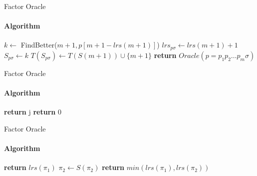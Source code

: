 \begin{frame}[fragile]{Factor Oracle}
  \framesubtitle{Algorithm}
  \begin{algorithm}[H]
    \ContinuedFloat
    \caption{Incremental update of Factor Oracle}
    \begin{algorithmic}[1]
      \State $k \gets $ FindBetter($m+1, p[m+1-lrs(m+1)]$)
      \State $lrs_{p\sigma} \gets lrs(m+1) +1$
      \State $S_{p\sigma} \gets k$
      \EndIf
      \State $T(S_{p\sigma}) \gets T(S(m+1)) \cup \{m+1\}$
      \State \textbf{return} $Oracle(p=p_{1}p_{2}\dots{}p_{m}\sigma)$
      \EndFunction
    \end{algorithmic}
  \end{algorithm}
\end{frame}

\begin{frame}[fragile]{Factor Oracle}
  \framesubtitle{Algorithm}
  \begin{algorithm}[H]
    \caption{Find Better Algorithm}\label{alg:fb}
    \begin{algorithmic}[1]
      \State \textbf{return} j
      \EndIf
      \EndFor
      \State \textbf{return} 0
      \EndFunction
    \end{algorithmic}
  \end{algorithm}
\end{frame}

\begin{frame}[fragile]{Factor Oracle}
  \framesubtitle{Algorithm}
  \begin{algorithm}[H]
    \caption{Length Common Suffix Algorithm}\label{alg:lcs}
    \begin{algorithmic}[1]
      \State \textbf{return} $lrs(\pi_{1})$
      \Else
      \State $\pi_{2} \gets S(\pi_{2})$
      \EndWhile
      \EndIf
      \State \textbf{return} $min(lrs(\pi_{1}),lrs(\pi_{2}))$
      \EndFunction
    \end{algorithmic}
  \end{algorithm}
\end{frame}


